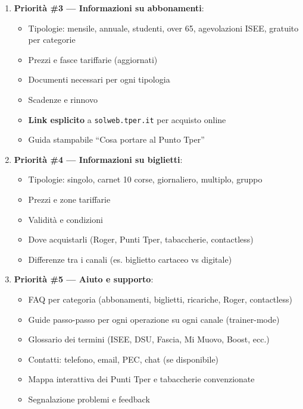 \begin{tcolorbox}[colback=backgroundColor,colframe=borderColor,arc=2mm]
{\begin{enumerate}[leftmargin=*]
 \item \textbf{Priorità \#3 --- Informazioni su abbonamenti}:
 \begin{itemize}
   \item Tipologie: mensile, annuale, studenti, over 65, agevolazioni ISEE, gratuito per categorie
   \item Prezzi e fasce tariffarie (aggiornati)
   \item Documenti necessari per ogni tipologia
   \item Scadenze e rinnovo
   \item \textbf{Link esplicito} a \texttt{solweb.tper.it} per acquisto online
   \item Guida stampabile ``Cosa portare al Punto Tper''
 \end{itemize}

 \item \textbf{Priorità \#4 --- Informazioni su biglietti}:
 \begin{itemize}
   \item Tipologie: singolo, carnet 10 corse, giornaliero, multiplo, gruppo
   \item Prezzi e zone tariffarie
   \item Validità e condizioni
   \item Dove acquistarli (Roger, Punti Tper, tabaccherie, contactless)
   \item Differenze tra i canali (es. biglietto cartaceo vs digitale)
 \end{itemize}

 \item \textbf{Priorità \#5 --- Aiuto e supporto}:
 \begin{itemize}
   \item FAQ per categoria (abbonamenti, biglietti, ricariche, Roger, contactless)
   \item Guide passo-passo per ogni operazione su ogni canale (trainer-mode)
   \item Glossario dei termini (ISEE, DSU, Fascia, Mi Muovo, Boost, ecc.)
   \item Contatti: telefono, email, PEC, chat (se disponibile)
   \item Mappa interattiva dei Punti Tper e tabaccherie convenzionate
   \item Segnalazione problemi e feedback
 \end{itemize}


\end{enumerate}}
\end{tcolorbox}
